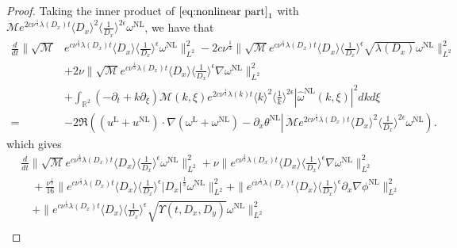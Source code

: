 \documentclass[reqno, 12pt]{amsart} %
\theoremstyle{plain} %
\theoremstyle{definition}
\theoremstyle{remark}
\numberwithin{equation}{section} %
\newcommand{\px}{\partial_x}
\begin{document}
	\begin{proof}
		Taking the inner product of $\eqref{eq:nonlinear part}_1$ with $\mathcal{M} e^{2 c \nu^{\frac{1}{3}} \lambda\left(D_x\right) t}\langle D_x\rangle^2\langle\frac{1}{D_x}\rangle^{2 \epsilon} \omega^{\mathrm{NL}}$, we have that
		$$
		\begin{aligned}
			\frac{d}{d t} \| \sqrt{\mathcal{M}} & e^{c \nu^{\frac{1}{3}} \lambda\left(D_x\right) t}\langle D_x\rangle \langle\frac{1}{D_x}\rangle^\epsilon \omega^{\mathrm{NL}}\|_{L^2}^2-2 c \nu^{\frac{1}{3}}\| \sqrt{\mathcal{M}} e^{c \nu^{\frac{1}{3}} \lambda\left(D_x\right) t}\langle D_x\rangle\langle\frac{1}{D_x}\rangle^\epsilon \sqrt{\lambda\left(D_x\right)} \omega^{\mathrm{NL}} \|_{L^2}^2 \\
			& +2 \nu\|\sqrt{\mathcal{M}} e^{c \nu^{\frac{1}{3}} \lambda\left(D_x\right) t}\langle D_x\rangle\langle\frac{1}{D_x}\rangle^\epsilon \nabla\omega^{\mathrm{NL}}\|_{L^2}^2 \\
			& +\int_{\mathbb{R}^2}\left(-\partial_t+k \partial_{\xi}\right) \mathcal{M}(k, \xi) e^{2 c \nu^{\frac{1}{3}} \lambda(k) t}\langle k\rangle^2\langle\frac{1}{k}\rangle^{2 \epsilon}  \left|\hat{\omega}^{\mathrm{NL}}(k, \xi)\right|^2 d k d \xi \\
			= & -2 \Re\left(\left(u^{\mathrm{L}}+u^{\mathrm{NL}}\right) \cdot \nabla\left(\omega^{\mathrm{L}}+\omega^{\mathrm{NL}}\right) - \px \theta^{\mathrm{NL}} \left\lvert\, \mathcal{M} e^{2 c \nu^{\frac{1}{3}} \lambda\left(D_x\right) t}\langle D_x\rangle^2\langle\frac{1}{D_x}\rangle^{2 \epsilon}  \omega^{\mathrm{NL}}\right.\right).
		\end{aligned}
		$$
		which gives 
		\begin{align*}
			& \frac{d}{d t}\|\sqrt{\mathcal{M}} e^{c \nu^{\frac{1}{3}} \lambda\left(D_x\right) t}\langle D_x\rangle\langle\frac{1}{D_x}\rangle^\epsilon \omega^{\mathrm{NL}}\|_{L^2}^2+\nu\|e^{c \nu^{\frac{1}{3}} \lambda\left(D_x\right) t}\langle D_x\rangle\langle\frac{1}{D_x}\rangle^\epsilon \nabla \omega^{\mathrm{NL}}\|_{L^2}^2 \\
			& \quad+\frac{\nu^{\frac{1}{3}}}{16}\|e^{c \nu^{\frac{1}{3}} \lambda\left(D_x\right) t}\langle D_x\rangle\langle\frac{1}{D_x}\rangle^\epsilon\left|D_x\right|^{\frac{1}{3}}  \omega^{\mathrm{NL}}\|_{L^2}^2  + \|e^{c \nu^{\frac{1}{3}} \lambda\left(D_x\right) t}\langle D_x\rangle\langle\frac{1}{D_x}\rangle^\epsilon \partial_x \nabla \phi^{\mathrm{NL}}\|_{L^2}^2
			\\
			& \quad+\|e^{c \nu^{\frac{1}{3}} \lambda\left(D_x\right) t}\langle D_x\rangle\langle\frac{1}{D_x}\rangle^\epsilon \sqrt{\Upsilon\left(t, D_x, D_y\right)} \omega^{\mathrm{NL}}\|_{L^2}^2 \\

\end{align*}
\end{proof}
\end{document}
